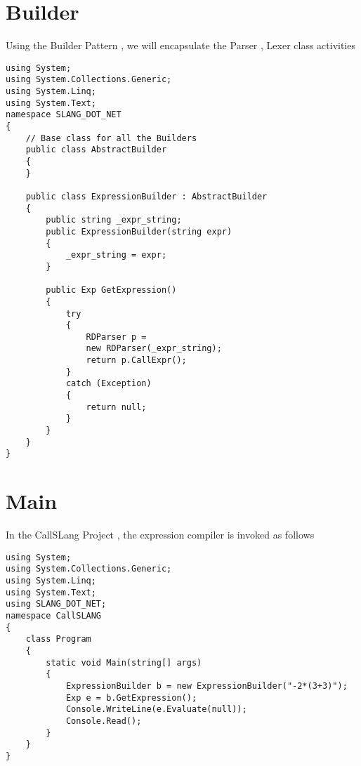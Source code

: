 \section{Builder}
Using the Builder Pattern , we will encapsulate the Parser , Lexer class activities
\lstset{style=csharp}
\begin{lstlisting}
using System;
using System.Collections.Generic;
using System.Linq;
using System.Text;
namespace SLANG_DOT_NET
{
	// Base class for all the Builders
	public class AbstractBuilder
	{
	}

	public class ExpressionBuilder : AbstractBuilder
	{
		public string _expr_string;
		public ExpressionBuilder(string expr)
		{
			_expr_string = expr;
		}
		
		public Exp GetExpression()
		{
			try
			{
				RDParser p = 
				new RDParser(_expr_string);
				return p.CallExpr();
			}
			catch (Exception)
			{
				return null;
			}
		}
	}
}
\end{lstlisting}

\section{Main}
In the CallSLang Project , the expression compiler is invoked as follows
\lstset{style=csharp}
\begin{lstlisting}
using System;
using System.Collections.Generic;
using System.Linq;
using System.Text;
using SLANG_DOT_NET;
namespace CallSLANG
{
	class Program
	{
		static void Main(string[] args)
		{
			ExpressionBuilder b = new ExpressionBuilder("-2*(3+3)");
			Exp e = b.GetExpression();
			Console.WriteLine(e.Evaluate(null));
			Console.Read();
		}
	} 
}
\end{lstlisting}